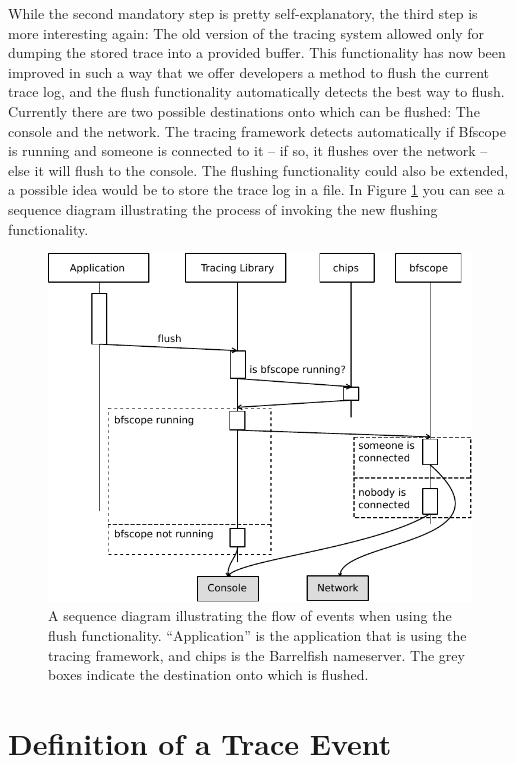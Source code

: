 \documentclass[a4paper,11pt,twoside]{report}
\begin{document}
While the second mandatory step is pretty self-explanatory, the third step is
more interesting again: The old version of the tracing system allowed only for
dumping the stored trace into a provided buffer. This functionality has now been
improved in such a way that we offer developers a method to flush the current
trace log, and the flush functionality automatically detects the best way to
flush. Currently there are two possible destinations onto which can be flushed:
The console and the network. The tracing framework detects automatically if
Bfscope is running and someone is connected to it -- if so, it flushes over the
network -- else it will flush to the console. The flushing functionality could
also be extended, a possible idea would be to store the trace log in a file. In
Figure \ref{fig:flush} you can see a sequence diagram illustrating the process
of invoking the new flushing functionality.

\begin{figure}[t]
	\begin{center}
		\includegraphics{images/flush.pdf}
	\end{center}
	\caption{A sequence diagram illustrating the flow of events when using the
	flush functionality. ``Application'' is the application that is using the
tracing framework, and chips is the Barrelfish nameserver. The grey boxes
indicate the destination onto which is flushed.}
	\label{fig:flush}
\end{figure}


\section{Definition of a Trace Event\label{sec:trace-event}}
\end{document}
